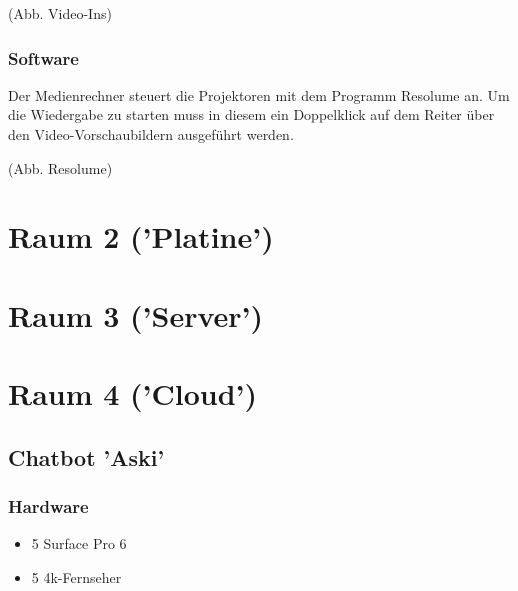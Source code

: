 \documentclass[titlepage,a4paper]{article}
\begin{document}
(Abb. Video-Ins)

\subsubsection{Software}

Der Medienrechner steuert die Projektoren mit dem Programm Resolume an. Um die Wiedergabe zu starten muss in diesem ein Doppelklick auf dem Reiter über den Video-Vorschaubildern ausgeführt werden.

(Abb. Resolume)

\section{Raum 2 ('Platine')}

\section{Raum 3 ('Server')}

\section{Raum 4 ('Cloud')}

\subsection{Chatbot 'Aski'}

\subsubsection{Hardware}

\begin{itemize}
\item 5 Surface Pro 6
\item 5 4k-Fernseher
\end{itemize}
\end{document}
